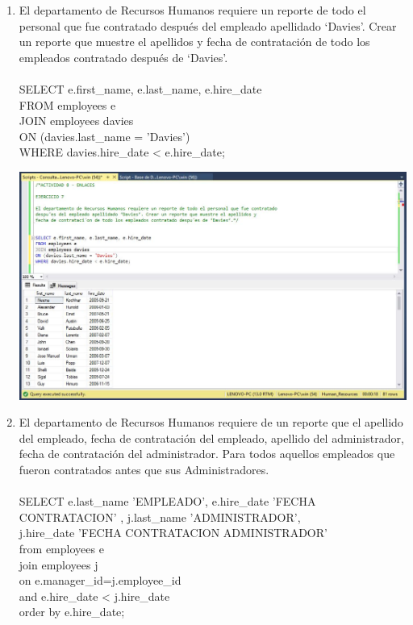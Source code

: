 \begin{enumerate}[1.]
	\item El departamento de Recursos Humanos requiere un reporte de todo el personal que fue contratado después del empleado apellidado ‘Davies’. Crear un reporte que muestre el apellidos y fecha de contrataci\'on de todo los empleados contratado después de ‘Davies’.
	\\
	\\SELECT e.first\_name, e.last\_name, e.hire\_date
	\\FROM employees e
	\\JOIN employees davies
	\\ON (davies.last\_name = 'Davies')
	\\WHERE davies.hire\_date <  e.hire\_date;\\


	\begin{center}
	\includegraphics[width=17cm]{./Imagenes/Actividad8-Ejercicio07} 
	\end{center}


	\item El departamento de Recursos Humanos requiere de un reporte que el apellido del empleado, fecha de contrataci\'on del empleado, apellido del administrador, fecha de contratación del administrador. Para todos aquellos empleados que fueron contratados antes que sus Administradores.
	\\
	\\SELECT e.last\_name 'EMPLEADO', e.hire\_date 'FECHA CONTRATACION' , j.last\_name 'ADMINISTRADOR',
	\\j.hire\_date 'FECHA CONTRATACION ADMINISTRADOR'
	\\from employees e
	\\join employees j
	\\on e.manager\_id=j.employee\_id
	\\and e.hire\_date <  j.hire\_date
	\\order by e.hire\_date;\\


\end{enumerate}
